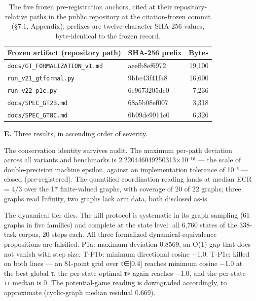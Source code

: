 \documentclass[11pt,a4paper]{article}
\begin{document}
\begin{table}[htbp]
\centering
\small
\setlength{\tabcolsep}{5pt}
\renewcommand{\arraystretch}{1.18}
\begin{tabularx}{0.94\textwidth}{@{}>{\raggedright\arraybackslash}X l r@{}}
\toprule
\textbf{Frozen artifact (repository path)} & \textbf{SHA-256 prefix} & \textbf{Bytes} \\
\midrule
\texttt{docs/\allowbreak GT\_\allowbreak FORMALIZATION\_\allowbreak v1.md} & aeefb8ef6972 & 19,100 \\
\texttt{run\_\allowbreak v21\_\allowbreak gtformal.py} & 9bbe43f41fa8 & 16,600 \\
\texttt{run\_\allowbreak v22\_\allowbreak p1c.py} & 6e9673205dc0 & 7,236 \\
\texttt{docs/\allowbreak SPEC\_\allowbreak GT2B.md} & 68a5b08ef007 & 3,318 \\
\texttt{docs/\allowbreak SPEC\_\allowbreak GT8C.md} & 6b09de9911c0 & 6,326 \\
\bottomrule
\end{tabularx}
\caption{The five frozen pre-registration anchors, cited at their repository-relative paths in the public repository at the citation-frozen commit (§7.1, Appendix); prefixes are twelve-character SHA-256 values, byte-identical to the frozen record.}
\label{tab:anchors}
\end{table}

\textbf{E.} Three results, in ascending order of severity.

The conservation identity survives audit. The maximum per-path deviation across all variants and benchmarks is 2.220446049250313×10⁻¹⁶ — the scale of double-precision machine epsilon, against an implementation tolerance of 10⁻⁶ — closed (pre-registered). The quantified coordination reading lands at median ECR = 4/3 over the 17 finite-valued graphs, with coverage of 20 of 22 graphs; three graphs read Infinity, two graphs lack arm data, both disclosed as-is.

The dynamical tier dies. The kill protocol is systematic in its graph sampling (61 graphs in five families) and complete at the state level: all 6,760 states of the 338-task corpus, 20 steps each. All three formalized dynamical-equivalence propositions are falsified. P1a: maximum deviation 0.8569, an O(1) gap that does not vanish with step size. T-P1b: minimum directional cosine −1.0. T-P1c: killed on both lines — an 81-point grid over τ∈[0,4] reaches minimum cosine −1.0 at the best global τ, the per-state optimal τ∗ again reaches −1.0, and the per-state τ∗ median is 0. The potential-game reading is downgraded accordingly, to approximate (cyclic-graph median residual 0.669).
\end{document}
